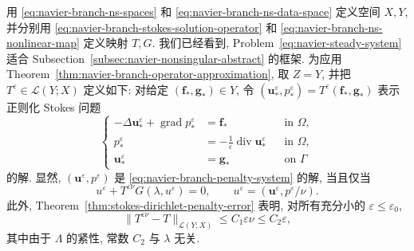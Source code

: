 \begin{Proof}
用 \eqref{eq:navier-branch-ns-spaces} 和
\eqref{eq:navier-branch-ns-data-space} 定义空间 $X,Y$, 并分别用
\eqref{eq:navier-branch-stokes-solution-operator} 和 \eqref{eq:navier-branch-ns-nonlinear-map}
定义映射 $T,G$. 我们已经看到,
Problem~\eqref{eq:navier-steady-system}
适合 Subsection~\ref{subsec:navier-nonsingular-abstract} 的框架. 为应用
Theorem~\ref{thm:navier-branch-operator-approximation}, 取 $Z=Y$, 并把
$T^\varepsilon\in\mathcal L(Y;X)$ 定义如下: 对给定
$(\boldsymbol f_*,\boldsymbol g_*)\in Y$, 令
$(\boldsymbol u_*^\varepsilon,p_*^\varepsilon)
=T^\varepsilon(\boldsymbol f_*,\boldsymbol g_*)$ 表示正则化 Stokes 问题
\[
\left\{
\begin{aligned}
-\Delta\boldsymbol u_*^\varepsilon+\operatorname{grad}p_*^\varepsilon
&=\boldsymbol f_* &&\text{in }\Omega,\\
p_*^\varepsilon&=-\frac1\varepsilon
\operatorname{div}\boldsymbol u_*^\varepsilon &&\text{in }\Omega,\\
\boldsymbol u_*^\varepsilon&=\boldsymbol g_* &&\text{on }\Gamma
\end{aligned}
\right.
\]
的解. 显然, $(\boldsymbol u^\varepsilon,p^\varepsilon)$ 是
\eqref{eq:navier-branch-penalty-system} 的解, 当且仅当
\[
u^\varepsilon+T^{\varepsilon\nu}G(\lambda,u^\varepsilon)=0,
\qquad
u^\varepsilon=(\boldsymbol u^\varepsilon,p^\varepsilon/\nu).
\]
此外, Theorem~\ref{thm:stokes-dirichlet-penalty-error} 表明, 对所有充分小的
$\varepsilon\leq\varepsilon_0$,
\[
\|T^{\varepsilon\nu}-T\|_{\mathcal L(Y;X)}
\leq C_1\varepsilon\nu\leq C_2\varepsilon,
\]
其中由于 $\Lambda$ 的紧性, 常数 $C_2$ 与 $\lambda$ 无关.


\end{Proof}

